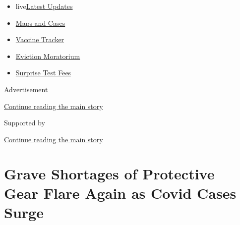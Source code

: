 \begin{itemize}
\tightlist
\item
  live\href{https://www.nytimes3xbfgragh.onion/2020/09/09/world/covid-coronavirus.html?name=styln-coronavirus-national\&region=TOP_BANNER\&block=storyline_menu_recirc\&action=click\&pgtype=Article\&impression_id=97a76521-f2d4-11ea-b9d1-d10fb06eae1c\&variant=undefined}{Latest
  Updates}
\item
  \href{https://www.nytimes3xbfgragh.onion/interactive/2020/us/coronavirus-us-cases.html?name=styln-coronavirus-national\&region=TOP_BANNER\&block=storyline_menu_recirc\&action=click\&pgtype=Article\&impression_id=97a78c30-f2d4-11ea-b9d1-d10fb06eae1c\&variant=undefined}{Maps
  and Cases}
\item
  \href{https://www.nytimes3xbfgragh.onion/interactive/2020/science/coronavirus-vaccine-tracker.html?name=styln-coronavirus-national\&region=TOP_BANNER\&block=storyline_menu_recirc\&action=click\&pgtype=Article\&impression_id=97a78c31-f2d4-11ea-b9d1-d10fb06eae1c\&variant=undefined}{Vaccine
  Tracker}
\item
  \href{https://www.nytimes3xbfgragh.onion/2020/09/02/your-money/eviction-moratorium-covid.html?name=styln-coronavirus-national\&region=TOP_BANNER\&block=storyline_menu_recirc\&action=click\&pgtype=Article\&impression_id=97a78c32-f2d4-11ea-b9d1-d10fb06eae1c\&variant=undefined}{Eviction
  Moratorium}
\item
  \href{https://www.nytimes3xbfgragh.onion/2020/09/09/upshot/coronavirus-surprise-test-fees.html?name=styln-coronavirus-national\&region=TOP_BANNER\&block=storyline_menu_recirc\&action=click\&pgtype=Article\&impression_id=97a78c33-f2d4-11ea-b9d1-d10fb06eae1c\&variant=undefined}{Surprise
  Test Fees}
\end{itemize}

Advertisement

\protect\hyperlink{after-top}{Continue reading the main story}

Supported by

\protect\hyperlink{after-sponsor}{Continue reading the main story}

\hypertarget{grave-shortages-of-protective-gear-flare-again-as-covid-cases-surge}{%
\section{Grave Shortages of Protective Gear Flare Again as Covid Cases
Surge}\label{grave-shortages-of-protective-gear-flare-again-as-covid-cases-surge}}

